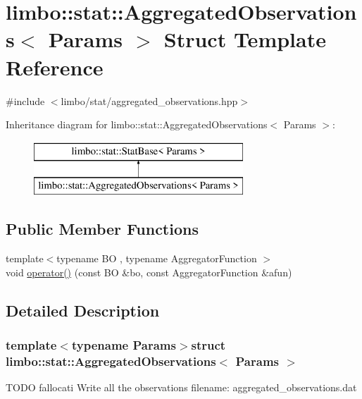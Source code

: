 \hypertarget{structlimbo_1_1stat_1_1_aggregated_observations}{}\section{limbo\+:\+:stat\+:\+:Aggregated\+Observations$<$ Params $>$ Struct Template Reference}
\label{structlimbo_1_1stat_1_1_aggregated_observations}


{\ttfamily \#include $<$limbo/stat/aggregated\+\_\+observations.\+hpp$>$}

Inheritance diagram for limbo\+:\+:stat\+:\+:Aggregated\+Observations$<$ Params $>$\+:\begin{figure}[H]
\begin{center}
\leavevmode
\includegraphics[height=2.000000cm]{structlimbo_1_1stat_1_1_aggregated_observations}
\end{center}
\end{figure}
\subsection*{Public Member Functions}
\begin{DoxyCompactItemize}
\item 
{\footnotesize template$<$typename B\+O , typename Aggregator\+Function $>$ }\\void \hyperlink{structlimbo_1_1stat_1_1_aggregated_observations_a99c53c6147e0d5ae26a7d4707a978611}{operator()} (const B\+O \&bo, const Aggregator\+Function \&afun)
\end{DoxyCompactItemize}


\subsection{Detailed Description}
\subsubsection*{template$<$typename Params$>$struct limbo\+::stat\+::\+Aggregated\+Observations$<$ Params $>$}

T\+O\+D\+O fallocati Write all the observations filename\+: {\ttfamily aggregated\+\_\+observations.\+dat} 

